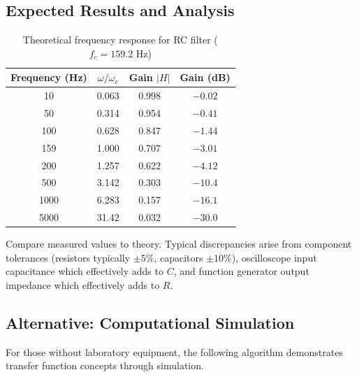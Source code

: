 \subsection{Expected Results and Analysis}

\begin{table}[h]
\centering
\caption{Theoretical frequency response for RC filter ($f_c = 159.2$ Hz)}
\label{tab:rc_response}
\begin{tabular}{@{}cccc@{}}
\toprule
\textbf{Frequency (Hz)} & $\omega/\omega_c$ & \textbf{Gain} $|H|$ & \textbf{Gain (dB)} \\
\midrule
10 & 0.063 & 0.998 & $-0.02$ \\
50 & 0.314 & 0.954 & $-0.41$ \\
100 & 0.628 & 0.847 & $-1.44$ \\
159 & 1.000 & 0.707 & $-3.01$ \\
200 & 1.257 & 0.622 & $-4.12$ \\
500 & 3.142 & 0.303 & $-10.4$ \\
1000 & 6.283 & 0.157 & $-16.1$ \\
5000 & 31.42 & 0.032 & $-30.0$ \\
\bottomrule
\end{tabular}
\end{table}

Compare measured values to theory. Typical discrepancies arise from component tolerances (resistors typically $\pm 5\%$, capacitors $\pm 10\%$), oscilloscope input capacitance which effectively adds to $C$, and function generator output impedance which effectively adds to $R$.

\subsection{Alternative: Computational Simulation}

For those without laboratory equipment, the following algorithm demonstrates transfer function concepts through simulation.

